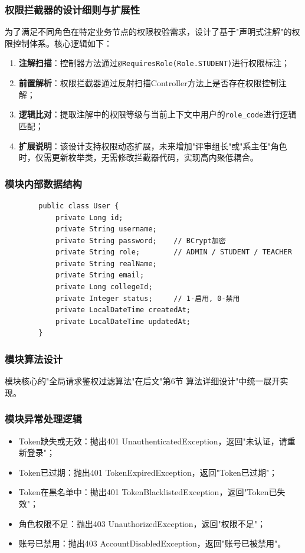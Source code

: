 \documentclass{../template/softeng}
\begin{document}
	\subsubsection{权限拦截器的设计细则与扩展性}
	为了满足不同角色在特定业务节点的权限校验需求，设计了基于"声明式注解"的权限控制体系。核心逻辑如下：
	\begin{enumerate}
		\item \textbf{注解扫描}：控制器方法通过\texttt{@RequiresRole(Role.STUDENT)}进行权限标注；
		\item \textbf{前置解析}：权限拦截器通过反射扫描Controller方法上是否存在权限控制注解；
		\item \textbf{逻辑比对}：提取注解中的权限等级与当前上下文中用户的\texttt{role\_code}进行逻辑匹配；
		\item \textbf{扩展说明}：该设计支持权限动态扩展，未来增加"评审组长"或"系主任"角色时，仅需更新枚举类，无需修改拦截器代码，实现高内聚低耦合。
	\end{enumerate}

	\subsubsection{模块内部数据结构}
	\begin{verbatim}
		public class User {
			private Long id;
			private String username;
			private String password;    // BCrypt加密
			private String role;        // ADMIN / STUDENT / TEACHER
			private String realName;
			private String email;
			private Long collegeId;
			private Integer status;     // 1-启用, 0-禁用
			private LocalDateTime createdAt;
			private LocalDateTime updatedAt;
		}
	\end{verbatim}

	\subsubsection{模块算法设计}
	模块核心的"全局请求鉴权过滤算法"在后文"第6节 算法详细设计"中统一展开实现。

	\subsubsection{模块异常处理逻辑}
	\begin{itemize}
		\item Token缺失或无效：抛出401 UnauthenticatedException，返回"未认证，请重新登录"；
		\item Token已过期：抛出401 TokenExpiredException，返回"Token已过期"；
		\item Token在黑名单中：抛出401 TokenBlacklistedException，返回"Token已失效"；
		\item 角色权限不足：抛出403 UnauthorizedException，返回"权限不足"；
		\item 账号已禁用：抛出403 AccountDisabledException，返回"账号已被禁用"。
	\end{itemize}
\end{document}
